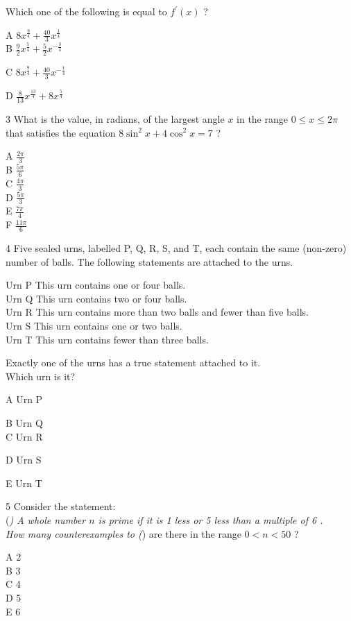 \documentclass[10pt]{article}
\begin{document}
Which one of the following is equal to $f^{\prime}(x)$ ?

A $8 x^{\frac{9}{4}}+\frac{40}{3} x^{\frac{1}{4}}$\\
B $\frac{9}{2} x^{\frac{5}{4}}+\frac{5}{2} x^{-\frac{3}{4}}$

C $8 x^{\frac{9}{4}}+\frac{40}{3} x^{-\frac{1}{4}}$

D $\frac{8}{13} x^{\frac{13}{4}}+8 x^{\frac{5}{4}}$

3 What is the value, in radians, of the largest angle $x$ in the range $0 \leq x \leq 2 \pi$ that satisfies the equation $8 \sin ^{2} x+4 \cos ^{2} x=7$ ?

A $\frac{2 \pi}{3}$\\
B $\frac{5 \pi}{6}$\\
C $\frac{4 \pi}{3}$\\
D $\frac{5 \pi}{3}$\\
E $\frac{7 \pi}{4}$\\
F $\frac{11 \pi}{6}$

4 Five sealed urns, labelled P, Q, R, S, and T, each contain the same (non-zero) number of balls. The following statements are attached to the urns.

Urn P This urn contains one or four balls.\\
Urn Q This urn contains two or four balls.\\
Urn R This urn contains more than two balls and fewer than five balls.\\
Urn S This urn contains one or two balls.\\
Urn T This urn contains fewer than three balls.

Exactly one of the urns has a true statement attached to it.\\
Which urn is it?

A Urn P

B Urn Q\\
C Urn R

D Urn S

E Urn T

5 Consider the statement:\\
(\textit{) A whole number $n$ is prime if it is 1 less or 5 less than a multiple of 6 .\\
How many counterexamples to (}) are there in the range $0<n<50$ ?

A 2\\
B 3\\
C 4\\
D 5\\
E 6
\end{document}
